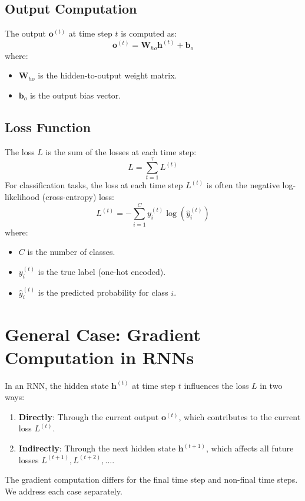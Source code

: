 \begin{notechapter}
\subsection{Output Computation}
The output \(\mathbf{o}^{(t)}\) at time step \(t\) is computed as:
\[
\mathbf{o}^{(t)} = \mathbf{W}_{ho} \mathbf{h}^{(t)} + \mathbf{b}_o
\]
where:
\begin{itemize}
    \item \(\mathbf{W}_{ho}\) is the hidden-to-output weight matrix.
    \item \(\mathbf{b}_o\) is the output bias vector.
\end{itemize}

\subsection{Loss Function}
The loss \(L\) is the sum of the losses at each time step:
\[
L = \sum_{t=1}^{\tau} L^{(t)}
\]
For classification tasks, the loss at each time step \(L^{(t)}\) is often the 
negative log-likelihood (cross-entropy) loss:
\[
L^{(t)} = -\sum_{i=1}^C y_i^{(t)} \log(\hat{y}_i^{(t)})
\]
where:
\begin{itemize}
    \item \(C\) is the number of classes.
    \item \(y_i^{(t)}\) is the true label (one-hot encoded).
    \item \(\hat{y}_i^{(t)}\) is the predicted probability for class \(i\).
\end{itemize}

\section{General Case: Gradient Computation in RNNs}
In an RNN, the hidden state \(\mathbf{h}^{(t)}\) at time step \(t\) 
influences the loss \(L\) in two ways:
\begin{enumerate}
    \item \textbf{Directly}: Through the current output \(\mathbf{o}^{(t)}\), 
          which contributes to the current loss \(L^{(t)}\).
    \item \textbf{Indirectly}: Through the next hidden state 
          \(\mathbf{h}^{(t+1)}\), which affects all future losses 
          \(L^{(t+1)}, L^{(t+2)}, \ldots\).
\end{enumerate}

The gradient computation differs for the final time step and non-final 
time steps. We address each case separately.


\end{notechapter}
